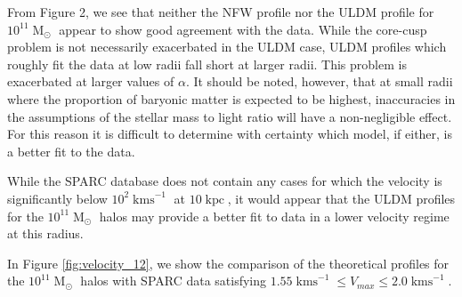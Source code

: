 \documentclass[a4paper,11pt]{article}
\begin{document}
From Figure 2, we see that neither the NFW profile nor the ULDM profile for $10^{11}\operatorname{M}_{\odot}$ appear to show good agreement with the data. While the core-cusp problem is not necessarily exacerbated in the ULDM case, ULDM profiles which roughly fit the data at low radii fall short at larger radii. This problem is exacerbated at larger values of $\alpha$. It should be noted, however, that at small radii where the proportion of baryonic matter is expected to be highest, inaccuracies in the assumptions of the stellar mass to light ratio will have a non-negligible effect. For this reason it is difficult to determine with certainty which model, if either, is a better fit to the data.

While the SPARC database does not contain any cases for which the velocity is significantly below $10^2\operatorname{kms}^{-1}$ at $10 \operatorname{kpc}$, it would appear that the ULDM profiles for the $10^{11}\operatorname{M}_{\odot}$ halos may provide a better fit to data in a lower velocity regime at this radius. 


In Figure \ref{fig:velocity_12}, we show the comparison of the theoretical profiles for the $10^{11}\operatorname{M}_{\odot}$ halos with SPARC data satisfying $1.55 \operatorname{kms}^{-1}\leq V_{max}\leq 2.0 \operatorname{kms}^{-1}$.
\end{document}
